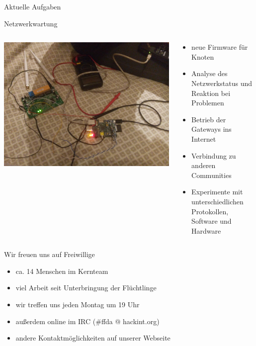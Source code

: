 \documentclass[10pt]{beamer}
\begin{document}
\begin{frame}{Aktuelle Aufgaben}
	\begin{center}
		\large Netzwerkwartung
		\vfill
	\end{center}
	\begin{columns}[T]
		\begin{column}{5cm}
			\includegraphics[width=\textwidth]{images/disassemble}
		\end{column}
		\begin{column}{7cm}
			\begin{itemize}[<+->]
				\item neue Firmware für Knoten
				\item Analyse des Netzwerkstatus und Reaktion bei Problemen
				\item Betrieb der Gateways ins Internet
				\item Verbindung zu anderen Communities
				\item Experimente mit unterschiedlichen Protokollen, Software und Hardware
			\end{itemize}
		\end{column}
	\end{columns}
\end{frame}

\begin{frame}{Wir freuen uns auf Freiwillige}
	\begin{itemize}[<+->]
		\item ca. 14 Menschen im Kernteam	
		\item viel Arbeit seit Unterbringung der Flüchtlinge
		\vfill
		\item wir treffen uns jeden Montag um 19 Uhr
		\item außerdem online im IRC (\#ffda @ hackint.org)
		\item andere Kontaktmöglichkeiten auf unserer Webseite
	\end{itemize}
\end{frame}
\end{document}
